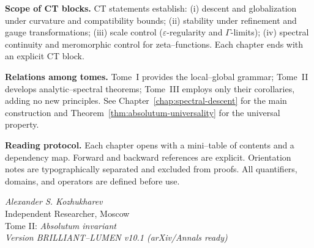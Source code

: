 \vspace{0.5em}
\noindent\textbf{Scope of CT blocks.}
CT statements establish:  
(i) descent and globalization under curvature and compatibility bounds;  
(ii) stability under refinement and gauge transformations;  
(iii) scale control (\(\varepsilon\)-regularity and \(\Gamma\)-limits);  
(iv) spectral continuity and meromorphic control for zeta–functions.  
Each chapter ends with an explicit CT block.

\vspace{0.5em}
\noindent\textbf{Relations among tomes.}
Tome~I provides the local–global grammar;  
Tome~II develops analytic–spectral theorems;  
Tome~III employs only their corollaries, adding no new principles.  
See Chapter~\ref{chap:spectral-descent} for the main construction 
and Theorem~\ref{thm:absolutum-universality} for the universal property.

\vspace{0.5em}
\noindent\textbf{Reading protocol.}
Each chapter opens with a mini–table of contents and a dependency map.  
Forward and backward references are explicit.  
Orientation notes are typographically separated and excluded from proofs.  
All quantifiers, domains, and operators are defined before use.

\vspace{1.25em}
\begin{flushright}
\textit{Alexander S. Kozhukharev}\\
Independent Researcher, Moscow\\
Tome II: \emph{Absolutum invariant}\\
\textit{Version BRILLIANT–LUMEN v10.1 (arXiv/Annals ready)}
\end{flushright}

